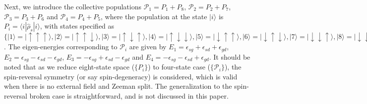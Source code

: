 \documentclass[twocolumn,preprintnumbers,amsmath,amssymb]{revtex4}
\begin{document}
Next, we introduce the collective populations $\mathcal{P}_1=P_{1}+P_8$, $\mathcal{P}_2=P_{2}+P_7$, $\mathcal{P}_3=P_{3}+P_6$
and $\mathcal{P}_4=P_{4}+P_5$, where the population at the state $|i{\rangle}$ is $P_i={\langle}i|\hat{\rho}_s|i{\rangle}$,
with states specified as
$\{|1{\rangle}=|{\uparrow}{\uparrow}{\uparrow}{\rangle},|2{\rangle}=|{\uparrow}{\uparrow}{\downarrow}{\rangle},
|3{\rangle}=|{\uparrow}{\downarrow}{\uparrow}{\rangle},|4{\rangle}=|{\uparrow}{\downarrow}{\downarrow}{\rangle},
|5{\rangle}=|{\downarrow}{\uparrow}{\uparrow}{\rangle},|6{\rangle}=|{\downarrow}{\uparrow}{\downarrow}{\rangle},
|7{\rangle}=|{\downarrow}{\downarrow}{\uparrow}{\rangle},|8{\rangle}=|{\downarrow}{\downarrow}{\downarrow}{\rangle}\}$.
The eigen-energies corresponding to $\mathcal{P}_i$ are given by
$E_1=\epsilon_{sg}+\epsilon_{sd}+\epsilon_{gd}$,
$E_2=\epsilon_{sg}-\epsilon_{sd}-\epsilon_{gd}$,
$E_3=-\epsilon_{sg}+\epsilon_{sd}-\epsilon_{gd}$ and
$E_4=-\epsilon_{sg}-\epsilon_{sd}+\epsilon_{gd}$.
It should be noted that as we reduce eight-state space ($\{P_i\}$) to four-state case ($\{\mathcal{P}_i\}$),
the spin-reversal symmetry (or say spin-degeneracy) is considered,
which is valid when there is no external field and Zeeman split.
The generalization to the spin-reversal broken case is straightforward, and is not discussed in this paper.
\end{document}
